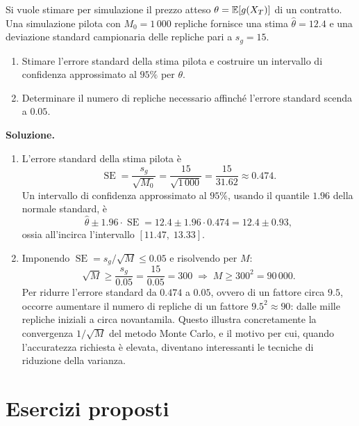 \begin{exercise}
\label{ex:montecarlo}
Si vuole stimare per simulazione il prezzo atteso $\theta=\mathbb{E}[g(X_T)]$
di un contratto. Una simulazione pilota con $M_0=1\,000$ repliche
fornisce una stima $\widehat{\theta}=12.4$ e una deviazione standard
campionaria delle repliche pari a $s_g=15$.
\begin{enumerate}
\item Stimare l'errore standard della stima pilota e costruire un
intervallo di confidenza approssimato al $95\%$ per $\theta$.
\item Determinare il numero di repliche necessario affinch\'{e}
l'errore standard scenda a $0.05$.
\end{enumerate}
\end{exercise}

\noindent
\textbf{Soluzione.}
\begin{enumerate}
\item L'errore standard della stima pilota \`{e}
\[
\operatorname{SE}=\frac{s_g}{\sqrt{M_0}}
=\frac{15}{\sqrt{1\,000}}
=\frac{15}{31.62}\approx 0.474.
\]
Un intervallo di confidenza approssimato al $95\%$, usando il
quantile $1.96$ della normale standard, \`{e}
\[
\widehat{\theta}\pm 1.96\cdot\operatorname{SE}
=12.4\pm 1.96\cdot 0.474
=12.4\pm 0.93,
\]
ossia all'incirca l'intervallo $[11.47,\;13.33]$.

\item Imponendo $\operatorname{SE}=s_g/\sqrt{M}\leq 0.05$ e
risolvendo per $M$:
\[
\sqrt{M}\geq\frac{s_g}{0.05}=\frac{15}{0.05}=300
\;\Longrightarrow\;
M\geq 300^2=90\,000.
\]
Per ridurre l'errore standard da $0.474$ a $0.05$, ovvero di un
fattore circa $9.5$, occorre aumentare il numero di repliche di un
fattore $9.5^2\approx 90$: dalle mille repliche iniziali a circa
novantamila. Questo illustra concretamente la convergenza $1/\sqrt{M}$
del metodo Monte Carlo, e il motivo per cui, quando l'accuratezza
richiesta \`{e} elevata, diventano interessanti le tecniche di
riduzione della varianza.
\end{enumerate}

%

\section{Esercizi proposti}
\label{sec:esercizi-proposti}

